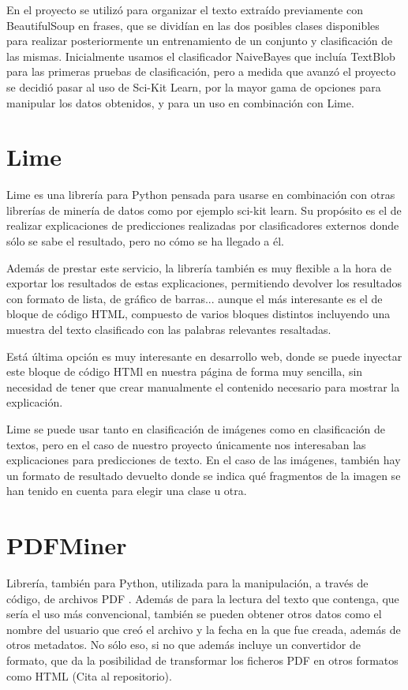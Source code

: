 En el proyecto se utilizó para organizar el texto extraído previamente con BeautifulSoup en frases, que se dividían en las dos posibles clases disponibles para realizar posteriormente un entrenamiento de un conjunto y clasificación de las mismas. Inicialmente usamos el clasificador NaiveBayes que incluía TextBlob para las primeras pruebas de clasificación, pero a medida que avanzó el proyecto se decidió pasar al uso de Sci-Kit Learn, por la mayor gama de opciones para manipular los datos obtenidos, y para un uso en combinación con Lime.

\section{Lime}

Lime \cite{lime} es una librería para Python pensada para usarse en combinación con otras librerías de minería de datos como por ejemplo sci-kit learn. Su propósito es el de realizar explicaciones de predicciones realizadas por clasificadores externos donde sólo se sabe el resultado, pero no cómo se ha llegado a él. 

Además de prestar este servicio, la librería también es muy flexible a la hora de exportar los resultados de estas explicaciones, permitiendo devolver los resultados con formato de lista, de gráfico de barras... aunque el más interesante es el de bloque de código HTML, compuesto de varios bloques distintos incluyendo una muestra del texto clasificado con las palabras relevantes resaltadas. 

Está última opción es muy interesante en desarrollo web, donde se puede inyectar este bloque de código HTMl en nuestra página de forma muy sencilla, sin necesidad de tener que crear manualmente el contenido necesario para mostrar la explicación.

Lime se puede usar tanto en clasificación de imágenes como en clasificación de textos, pero en el caso de nuestro proyecto únicamente nos interesaban las explicaciones para predicciones de texto. En el caso de las imágenes, también hay un formato de resultado devuelto donde se indica qué fragmentos de la imagen se han tenido en cuenta para elegir una clase u otra.

\section{PDFMiner}

Librería, también para Python, utilizada para la manipulación, a través de código, de archivos PDF \cite{shinyama2015pdfminer} \cite{pdfminer}. Además de para la lectura del texto que contenga, que sería el uso más convencional, también se pueden obtener otros datos como el nombre del usuario que creó el archivo y la fecha en la que fue creada, además de otros metadatos.
No sólo eso, si no que además incluye un convertidor de formato, que da la posibilidad de transformar los ficheros PDF en otros formatos como HTML (Cita al repositorio).


